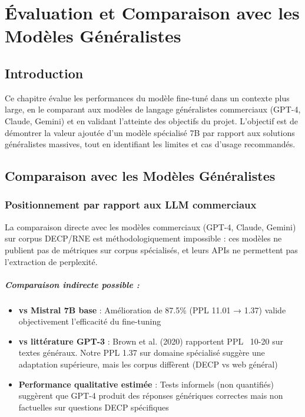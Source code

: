 
\chapter{Évaluation et Comparaison avec les Modèles Généralistes}

\section{Introduction}

Ce chapitre évalue les performances du modèle fine-tuné dans un contexte plus large, en le comparant aux modèles de langage généralistes commerciaux (GPT-4, Claude, Gemini) et en validant l'atteinte des objectifs du projet. L'objectif est de démontrer la valeur ajoutée d'un modèle spécialisé 7B par rapport aux solutions généralistes massives, tout en identifiant les limites et cas d'usage recommandés.

\section{Comparaison avec les Modèles Généralistes}

\subsection{Positionnement par rapport aux LLM commerciaux}

La comparaison directe avec les modèles commerciaux (GPT-4, Claude, Gemini) sur corpus DECP/RNE est méthodologiquement impossible : ces modèles ne publient pas de métriques sur corpus spécialisés, et leurs APIs ne permettent pas l'extraction de perplexité.

\paragraph{Comparaison indirecte possible :}
\begin{itemize}
    \item \textbf{vs Mistral 7B base} : Amélioration de 87.5\% (PPL 11.01 → 1.37) valide objectivement l'efficacité du fine-tuning
    \item \textbf{vs littérature GPT-3} : Brown et al. (2020) rapportent PPL ~10-20 sur textes généraux. Notre PPL 1.37 sur domaine spécialisé suggère une adaptation supérieure, mais les corpus diffèrent (DECP vs web général)
    \item \textbf{Performance qualitative estimée} : Tests informels (non quantifiés) suggèrent que GPT-4 produit des réponses génériques correctes mais non factuelles sur questions DECP spécifiques
\end{itemize}

